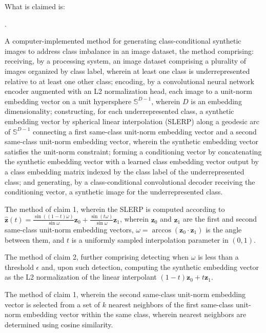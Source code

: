 \documentclass[12pt,letterpaper]{article}
\newcommand{\bz}{\mathbf{z}}
\newcounter{claimnum}
\newenvironment{claims}{%
  \setcounter{claimnum}{0}
  \begin{list}{\arabic{claimnum}.}{%
    \usecounter{claimnum}
    \setlength{\leftmargin}{2em}
    \setlength{\labelsep}{0.5em}
    \setlength{\itemsep}{0pt}
    \setlength{\parsep}{6pt plus 2pt}
  }%
}{\end{list}}
\begin{document}
What is claimed is:

\begin{claims}

\item A computer-implemented method for generating class-conditional synthetic
images to address class imbalance in an image dataset, the method comprising:
receiving, by a processing system, an image dataset comprising a plurality of
images organized by class label, wherein at least one class is underrepresented
relative to at least one other class;
encoding, by a convolutional neural network encoder augmented with an L2
normalization head, each image to a unit-norm embedding vector on a unit
hypersphere $\mathbb{S}^{D-1}$, wherein $D$ is an embedding dimensionality;
constructing, for each underrepresented class, a synthetic embedding vector by
spherical linear interpolation (SLERP) along a geodesic arc of $\mathbb{S}^{D-1}$
connecting a first same-class unit-norm embedding vector and a second same-class
unit-norm embedding vector, wherein the synthetic embedding vector satisfies the
unit-norm constraint;
forming a conditioning vector by concatenating the synthetic embedding vector
with a learned class embedding vector output by a class embedding matrix indexed
by the class label of the underrepresented class; and
generating, by a class-conditional convolutional decoder receiving the
conditioning vector, a synthetic image for the underrepresented class.

\item The method of claim 1, wherein the SLERP is computed according to
$\hat{\bz}(t) = \frac{\sin((1-t)\omega)}{\sin\omega}\bz_0 +
\frac{\sin(t\omega)}{\sin\omega}\bz_1$, wherein $\bz_0$ and $\bz_1$ are the
first and second same-class unit-norm embedding vectors, $\omega =
\arccos(\bz_0 \cdot \bz_1)$ is the angle between them, and $t$ is a
uniformly sampled interpolation parameter in $(0,1)$.

\item The method of claim 2, further comprising detecting when $\omega$ is
less than a threshold $\epsilon$ and, upon such detection, computing the
synthetic embedding vector as the L2 normalization of the linear interpolant
$(1-t)\bz_0 + t\bz_1$.

\item The method of claim 1, wherein the second same-class unit-norm embedding
vector is selected from a set of $k$ nearest neighbors of the first same-class
unit-norm embedding vector within the same class, wherein nearest neighbors
are determined using cosine similarity.


\end{claims}
\end{document}
